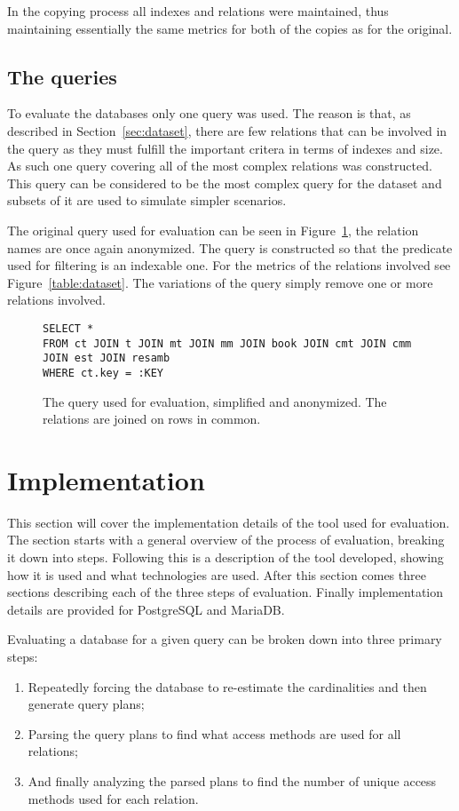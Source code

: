 In the copying process all indexes and relations were maintained, thus
maintaining essentially the same metrics for both of the copies as for the original.

\subsection{The queries}\label{sec:queries}
To evaluate the databases only one query was used. The reason is that, as
described in Section~\ref{sec:dataset}, there are few relations that can be
involved in the query as they must fulfill the important critera in terms of
indexes and size. As such one query covering all of the most complex relations was
constructed. This query can be considered to be the most complex query for the
dataset and subsets of it are used to simulate simpler scenarios.

The original query used for evaluation can be seen in
Figure~\ref{fig:sql:query1}, the relation names are once again anonymized. The
query is constructed so that the predicate used for filtering is an indexable
one. For the metrics of the relations involved see Figure~\ref{table:dataset}.
The variations of the query simply remove one or more relations involved.

\begin{figure}[ht]
\begin{verbatim}
SELECT *
FROM ct JOIN t JOIN mt JOIN mm JOIN book JOIN cmt JOIN cmm JOIN est JOIN resamb
WHERE ct.key = :KEY
\end{verbatim}
  \caption[ The original query used for evaluation ]{The query used for
    evaluation, simplified and anonymized. The relations are joined on rows in
    common.}\label{fig:sql:query1}
\end{figure}

\section{Implementation}\label{sec:implementation}
This section will cover the implementation details of the tool used for
evaluation. The section starts with a general overview of the process of
evaluation, breaking it down into steps. Following this is a description of the
tool developed, showing how it is used and what technologies are used. After
this section comes three sections describing each of the three steps of evaluation.
Finally implementation details are provided for PostgreSQL and MariaDB.\@

Evaluating a database for a given query can be broken down into three primary
steps:
\begin{enumerate}
\item Repeatedly forcing the database to re-estimate the cardinalities and then
  generate query plans;
\item Parsing the query plans to find what access methods are used for all
  relations;
\item And finally analyzing the parsed plans to find the number of unique access
  methods used for each relation.
\end{enumerate}

